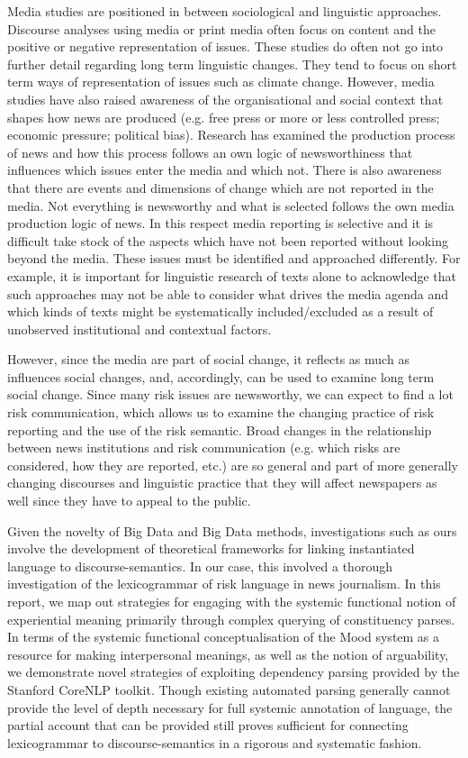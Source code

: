 Media studies are positioned in between sociological and linguistic approaches. Discourse analyses using media or print media often focus on content and the positive or negative representation of issues. These studies do often not go into further detail regarding long term linguistic changes. They tend to focus on short term ways of representation of issues such as climate change. However, media studies have also raised awareness of the organisational and social context that shapes how news are produced (e.g. free press or more or less controlled press; economic pressure; political bias). Research has examined the production process of news and how this process follows an own logic of newsworthiness that influences which issues enter the media and which not. There is also awareness that there are events and dimensions of change which are not reported in the media. Not everything is newsworthy and what is selected follows the own media production logic of news. In this respect media reporting is selective and it is difficult take stock of the aspects which have not been reported without looking beyond the media. These issues must be identified and approached differently. For example, it is important for linguistic research of texts alone to acknowledge that such approaches may not be able to consider what drives the media agenda and which kinds of texts might be systematically included/excluded as a result of unobserved institutional and contextual factors.

However, since the media are part of social change, it reflects as much as influences social changes, and, accordingly, can be used to examine long term social change. Since many risk issues are newsworthy, we can expect to find a lot risk communication, which allows us to examine the changing practice of risk reporting and the use of the risk semantic. Broad changes in the relationship between news institutions and risk communication (e.g. which risks are considered, how they are reported, etc.) are so general and part of more generally changing discourses and linguistic practice that they will affect newspapers as well since they have to appeal to the public.

Given the novelty of Big Data and Big Data methods, investigations such as ours involve the development of theoretical frameworks for linking instantiated language to discourse-semantics. In our case, this involved a thorough investigation of the lexicogrammar of risk language in news journalism. In this report, we map out strategies for engaging with the systemic functional notion of experiential meaning primarily through complex querying of constituency parses. In terms of the systemic functional conceptualisation of the Mood system as a resource for making interpersonal meanings, as well as the notion of arguability, we demonstrate novel strategies of exploiting dependency parsing provided by the Stanford CoreNLP toolkit. Though existing automated parsing generally cannot provide the level of depth necessary for full systemic annotation of language, the partial account that can be provided still proves sufficient for connecting lexicogrammar to discourse-semantics in a rigorous and systematic fashion.


